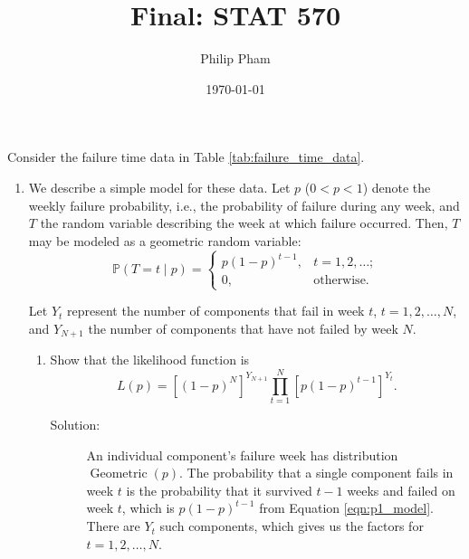 \documentclass[letterpaper,11pt]{article}
\title{Final: STAT 570}
\author{Philip Pham}
\date{\today}
\begin{document}
\maketitle

Consider the failure time data in Table \ref{tab:failure_time_data}.

\begin{enumerate}
\item We describe a simple model for these data. Let $p$ ($0 < p < 1$) denote
  the weekly failure probability, i.e., the probability of failure during any
  week, and $T$ the random variable describing the week at which failure
  occurred. Then, $T$ may be modeled as a geometric random variable:
  \begin{equation}
    \mathbb{P}\left(T = t \mid p\right)
    = \begin{cases}
      p\left(1-p\right)^{t-1}, &t=1,2,\ldots; \\
      0,&\text{otherwise}.      
    \end{cases}
    \label{eqn:p1_model}
  \end{equation}

  Let $Y_t$ represent the number of components that fail in week $t$,
  $t = 1,2,\ldots,N$, and $Y_{N+1}$ the number of components that have not failed
  by week $N$.

  \begin{enumerate}
  \item Show that the likelihood function is
    \begin{equation}
      L\left(p\right) =
      \left[\left(1 - p\right)^N\right]^{Y_{N+1}}
      \prod_{t=1}^N\left[
        p\left(1 - p\right)^{t-1}
      \right]^{Y_t}.
      \label{eqn:p1_likelihood}
    \end{equation}
    \begin{description}
    \item[Solution:] An individual component's failure week has distribution
      $\operatorname{Geometric}\left(p\right)$. The probability that a single
      component fails in week $t$ is the probability that it survived $t - 1$
      weeks and failed on week $t$, which is $p\left(1 - p\right)^{t-1}$ from
      Equation \ref{eqn:p1_model}. There are $Y_t$ such components, which gives
      us the factors for $t = 1,2,\ldots,N$.


\end{description}
\end{enumerate}
\end{enumerate}
\end{document}
